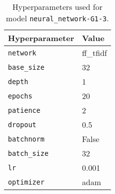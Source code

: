 \begin{table}[H]
\centering
\begin{tabularx}{0.48\textwidth}{|X|l|}
\hline
Hyperparameter & Value \\
\hline
\texttt{network} & ff\_tfidf \\
\texttt{base\_size} & 32 \\
\texttt{depth} & 1 \\
\texttt{epochs} & 20 \\
\texttt{patience} & 2 \\
\texttt{dropout} & 0.5 \\
\texttt{batchnorm} & False \\
\texttt{batch\_size} & 32 \\
\texttt{lr} & 0.001 \\
\texttt{optimizer} & adam \\
\hline
\end{tabularx}
\caption{Hyperparameters used for model \texttt{neural\_network-G1-3}.}
\label{tab:hyperparameters_best_neural_network}

\end{table}
